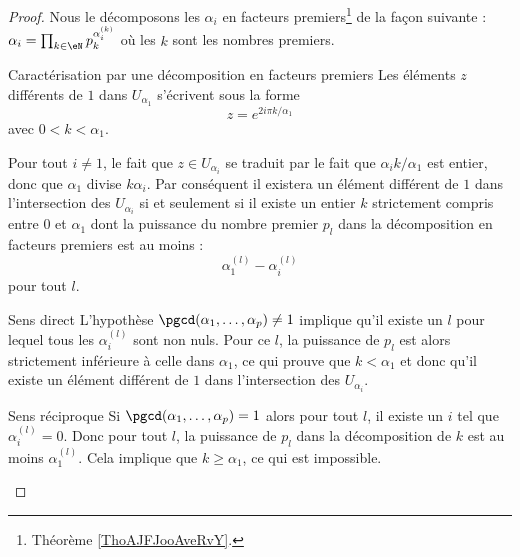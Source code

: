 \begin{proof}
    Nous le décomposons les \( \alpha_i\) en facteurs premiers\footnote{Théorème \ref{ThoAJFJooAveRvY}.} de la façon suivante : \( \alpha_i=\prod_{k\in \eN}p_k^{\alpha_i^{(k)}}\) où les \( k\) sont les nombres premiers. 
    
    \begin{subproof}
    \item[Caractérisation par une décomposition en facteurs premiers]
        Les éléments \( z\) différents de \( 1\) dans \( U_{\alpha_1}\) s'écrivent sous la forme
        \begin{equation}
            z= e^{2i\pi k/\alpha_1}
        \end{equation}
        avec \( 0<k<\alpha_1\).

        Pour tout \( i\neq 1\), le fait que \( z\in U_{\alpha_i}\) se traduit par le fait que \( \alpha_ik/\alpha_1\) est entier, donc que \( \alpha_1\) divise \( k\alpha_i\). Par conséquent il existera un élément différent de \( 1\) dans l'intersection des \( U_{\alpha_i}\) si et seulement si il existe un entier \( k\) strictement compris entre \( 0\) et \( \alpha_1\) dont la puissance du nombre premier \( p_l\) dans la décomposition en facteurs premiers est au moins :
        \begin{equation}
            \alpha_1^{(l)}-\alpha_i^{(l)}
        \end{equation}
        pour tout \( l\).
    \item[Sens direct]
        L'hypothèse \( \pgcd(\alpha_1,\ldots, \alpha_p)\neq 1\) implique qu'il existe un \( l\) pour lequel tous les \( \alpha_i^{(l)}\) sont non nuls. Pour ce \( l\), la puissance de \( p_l\) est alors strictement inférieure à celle dans \( \alpha_1\), ce qui prouve que \( k<\alpha_1\) et donc qu'il existe un élément différent de \( 1\) dans l'intersection des \( U_{\alpha_i}\).
    \item[Sens réciproque]
        Si \( \pgcd(\alpha_1,\ldots, \alpha_p)=1\) alors pour tout \( l\), il existe un \( i\) tel que \( \alpha_i^{(l)}=0\). Donc pour tout \( l\), la puissance de \( p_l\) dans la décomposition de \( k\) est au moins \( \alpha_1^{(l)}\). Cela implique que \( k\geq \alpha_1\), ce qui est impossible.
    \end{subproof}
\end{proof}

